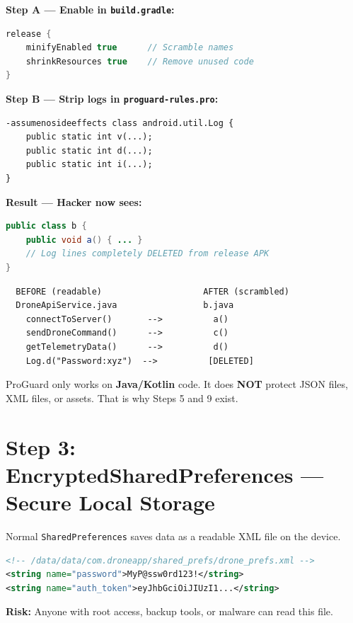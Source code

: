 \documentclass[11pt,a4paper]{article}
\newcommand{\danger}[1]{\textcolor{danger}{\textbf{#1}}}
\begin{document}
\begin{solutionbox}
\textbf{Step A --- Enable in \texttt{build.gradle}:}
\begin{lstlisting}[language=Java]
release {
    minifyEnabled true      // Scramble names
    shrinkResources true    // Remove unused code
}
\end{lstlisting}

\textbf{Step B --- Strip logs in \texttt{proguard-rules.pro}:}
\begin{lstlisting}
-assumenosideeffects class android.util.Log {
    public static int v(...);
    public static int d(...);
    public static int i(...);
}
\end{lstlisting}

\textbf{Result --- Hacker now sees:}
\begin{lstlisting}[language=Java]
public class b {
    public void a() { ... }
    // Log lines completely DELETED from release APK
}
\end{lstlisting}
\end{solutionbox}

\begin{diagrambox}
\begin{verbatim}
  BEFORE (readable)                    AFTER (scrambled)
  DroneApiService.java                 b.java
    connectToServer()       -->          a()
    sendDroneCommand()      -->          c()
    getTelemetryData()      -->          d()
    Log.d("Password:xyz")  -->          [DELETED]
\end{verbatim}
\end{diagrambox}

\begin{notebox}
ProGuard only works on \textbf{Java/Kotlin} code. It does \textbf{NOT} protect JSON files, XML files, or assets. That is why Steps 5 and 9 exist.
\end{notebox}

\newpage
\section{Step 3: EncryptedSharedPreferences --- Secure Local Storage}

\begin{problembox}
Normal \texttt{SharedPreferences} saves data as a readable XML file on the device.
\begin{lstlisting}[language=XML]
<!-- /data/data/com.droneapp/shared_prefs/drone_prefs.xml -->
<string name="password">MyP@ssw0rd123!</string>
<string name="auth_token">eyJhbGciOiJIUzI1...</string>
\end{lstlisting}
\danger{Risk:} Anyone with root access, backup tools, or malware can read this file.
\end{problembox}
\end{document}
